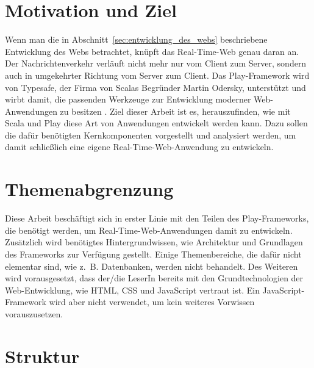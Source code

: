 

\section{Motivation und Ziel} %
\label{sec:motivation_und_ziel}

Wenn man die in Abschnitt~\ref{sec:entwicklung_des_webs} beschriebene Entwicklung des Webs betrachtet, knüpft das Real-Time-Web genau daran an.
Der Nachrichtenverkehr verläuft nicht mehr nur vom Client zum Server, sondern auch in umgekehrter Richtung vom Server zum Client.
Das Play-Framework wird von Typesafe, der Firma von Scalas Begründer Martin Odersky, unterstützt und wirbt damit, die passenden Werkzeuge zur Entwicklung moderner Web-Anwendungen zu besitzen \cite[vgl.][]{play}.
Ziel dieser Arbeit ist es, herauszufinden, wie mit Scala und Play diese Art von Anwendungen entwickelt werden kann.
Dazu sollen die dafür benötigten Kernkomponenten vorgestellt und analysiert werden, um damit schließlich eine eigene Real-Time-Web-Anwendung zu entwickeln.



\section{Themenabgrenzung} %
\label{sec:themenabgrenzung}

Diese Arbeit beschäftigt sich in erster Linie mit den Teilen des Play-Frameworks, die benötigt werden, um Real-Time-Web-Anwendungen damit zu entwickeln.
Zusätzlich wird benötigtes Hintergrundwissen, wie Architektur und Grundlagen des Frameworks zur Verfügung gestellt.
Einige Themenbereiche, die dafür nicht elementar sind, wie z.~B. Datenbanken, werden nicht behandelt.
Des Weiteren wird vorausgesetzt, dass der/die LeserIn bereits mit den Grundtechnologien der Web-Entwicklung, wie HTML, CSS und JavaScript vertraut ist.
Ein JavaScript-Framework wird aber nicht verwendet, um kein weiteres Vorwissen vorauszusetzen.



\section{Struktur} %
\label{sec:struktur}

